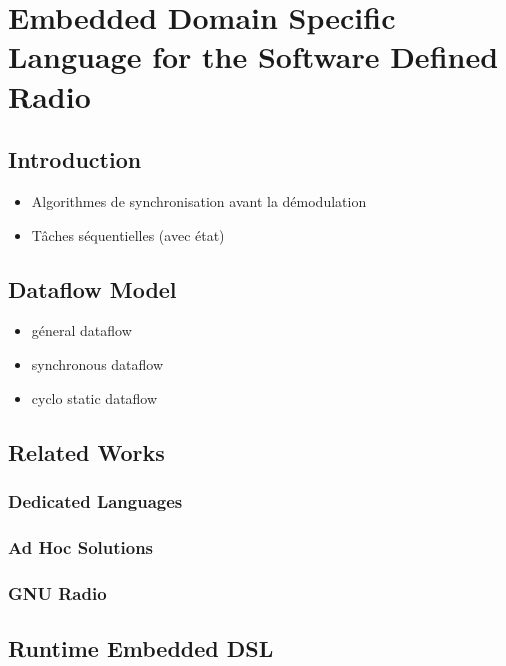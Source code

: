 \graphicspath{{main/chapter3/fig/}}

\chapter{Embedded Domain Specific Language for the Software Defined Radio}

\minitoccustom

\section{Introduction}

\begin{itemize}
  \item Algorithmes de synchronisation avant la démodulation
  \item Tâches séquentielles (avec état)
\end{itemize}

\section{Dataflow Model}

\begin{itemize}
  \item géneral dataflow
  \item synchronous dataflow
  \item cyclo static dataflow
\end{itemize}

\section{Related Works}

\subsection{Dedicated Languages}

\subsection{Ad Hoc Solutions}

\subsection{GNU Radio}

\section{Runtime Embedded DSL}

